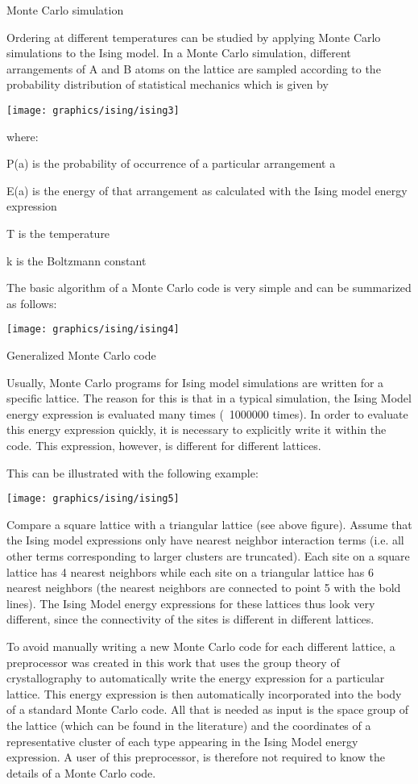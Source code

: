 Monte Carlo simulation

Ordering at different temperatures can be studied by applying Monte
Carlo simulations to the Ising model. In a Monte Carlo simulation,
different arrangements of A and B atoms on the lattice are sampled
according to the probability distribution of statistical mechanics
which is given by

\texttt{[image: graphics/ising/ising3]}

where:

P(a) is the probability of occurrence of a particular arrangement a

E(a) is the energy of that arrangement as calculated with the Ising model energy expression

T is the temperature

k is the Boltzmann constant

The basic algorithm of a Monte Carlo code is very simple and can be
summarized as follows:

\texttt{[image: graphics/ising/ising4]}

Generalized Monte Carlo code

Usually, Monte Carlo programs for Ising model simulations are written
for a specific lattice. The reason for this is that in a typical
simulation, the Ising Model energy expression is evaluated many times
(~1000000 times). In order to evaluate this energy expression quickly,
it is necessary to explicitly write it within the code. This
expression, however, is different for different lattices.

This can be illustrated with the following example:

\texttt{[image: graphics/ising/ising5]}

Compare a square lattice with a triangular lattice (see above
figure). Assume that the Ising model expressions only have nearest
neighbor interaction terms (i.e. all other terms corresponding to
larger clusters are truncated). Each site on a square lattice has 4
nearest neighbors while each site on a triangular lattice has 6
nearest neighbors (the nearest neighbors are connected to point 5 with
the bold lines). The Ising Model energy expressions for these lattices
thus look very different, since the connectivity of the sites is
different in different lattices.

To avoid manually writing a new Monte Carlo code for each different
lattice, a preprocessor was created in this work that uses the group
theory of crystallography to automatically write the energy expression
for a particular lattice. This energy expression is then automatically
incorporated into the body of a standard Monte Carlo code. All that is
needed as input is the space group of the lattice (which can be found
in the literature) and the coordinates of a representative cluster of
each type appearing in the Ising Model energy expression. A user of
this preprocessor, is therefore not required to know the details of a
Monte Carlo code.

